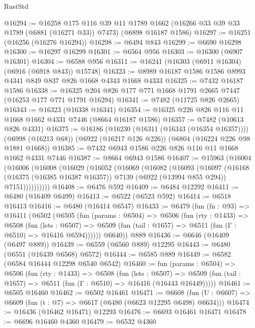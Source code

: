 \begin{lexlean}{RustStd}
\begin{coremodule}
@16294 := @16258
    @175
    @116
    @39
    @11
    @1789
    @1662
    (@16266 @33 @39 @33 @1789 (@6881 (@16271 @33)) @7473)
    (@6898 @16187 @1586)
@16297 := @16251 (@16256 (@16276 @16294))
@16298 := @6494 @843
@16299 := @6690 @16298
@16300 := @16297 @16299
@16301 := @6564 @956
@16303 := @16300 (@6907 @16301)
@16304 := @6588 @956
@16311 := @16241 (@16303 (@6911 @16304) (@6916 (@6918 @843)) @15748)
@16323 := @8989 @16187 @1586 @1586 @8993 @4341 @849 @837 @826 @1668 @4343 @1668 @4333
@16325 := @7432 @16187 @1586
@16338 := @16325 @204 @826 @177 @771 @1668 @1791 @2665 @7447 (@16253 @177 @771 @1791 @16294)
@16341 := @7482 (@11725 @826 @2665)
@16343 := @16323 (@16338 @16341)
@16354 := @16325 @226 @826 @116 @11 @1668 @1662 @4331 @7446 (@8664 @16187 @1586)
@16357 := @7482 (@10613 @826 @4331)
@16375 := @16186
    (@16230 (@16311 (@16343 (@16354 @16357))))
    (@6998 (@16213 @68))
    (@6922 (@16217 @126 @226))
    (@6804 (@16224 @226 @98 @1881 @1668))
@16385 := @7432 @6943 @1586 @226 @826 @116 @11 @1668 @1662 @4331 @7446
@16387 := @8664 @6943 @1586
@16407 := @15963
    (@16004
      (@16006
        (@16008
          (@16029
            (@16052
              (@16069
                (@16082
                  (@16093
                    (@16097
                      (@16168
                        (@16375 (@16385 @16387 @16357))
                        @7139
                        (@6922 (@13994 @855 @294))
                        @7151))))))))))
@16408 := @6476 @592
@16409 := @6484 @12292
@16411 := @6480 (@16409 @6499)
@16413 := @6522 (@6523 @592)
@16414 := @6518 @16413
@16416 := @6480 (@16414 @6547)
@16433 := @6479
    (fun (fn : @93) =>
    @16411
      (@6502
        (@6505
          (fun (params : @6504) =>
          @6506
            (fun (rty : @1433) =>
            @6508
              (fun (lets : @6507) =>
              @6509 (fun (tail : @1657) => @6511 (fun (Γ : @6510) => @16416 @6594))))))
        @6640))
    @889
@16436 := @6646 (@16409 (@6497 @889))
@16439 := @6559 (@6560 @889) @12295
@16443 := @6480 (@6551 (@16439 @6568) @6572)
@16444 := @6585 @889
@16449 := @6582 (@6584 @16444 @12298 @6540 @6542)
@16460 := fun (params : @6504) =>
  @6506
    (fun (rty : @1433) =>
    @6508
      (fun (lets : @6507) =>
      @6509 (fun (tail : @1657) => @6511 (fun (Γ : @6510) => @16416 (@16443 @16449)))))
@16461 := @6505 @16460
@16462 := @6502 @16461
@16471 := @6608
    (fun (U : @6607) => @6609 (fun (t : @7) => @6617 (@6480 (@6623 @12295 @6498) @6634)))
@16474 := @16436 (@16462 @16471) @12293
@16476 := @6693 @16461 @16471
@16478 := @6696 @16460 @4360
@16479 := @6532 @4360

\end{coremodule}
\end{lexlean}
